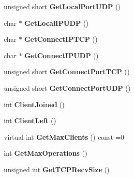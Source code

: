 \begin{DoxyCompactItemize}
\item 
\hypertarget{classcl_instance_a696669cb35e75be553df94b7593476bf}{
unsigned short {\bfseries GetLocalPortUDP} ()}
\label{classcl_instance_a696669cb35e75be553df94b7593476bf}

\item 
\hypertarget{classcl_instance_a43e412a4c0e23932fee3fb3b03f2c371}{
char $\ast$ {\bfseries GetLocalIPUDP} ()}
\label{classcl_instance_a43e412a4c0e23932fee3fb3b03f2c371}

\item 
\hypertarget{classcl_instance_a89e5a85c9993efcdd22b3fdb344acfbb}{
char $\ast$ {\bfseries GetConnectIPTCP} ()}
\label{classcl_instance_a89e5a85c9993efcdd22b3fdb344acfbb}

\item 
\hypertarget{classcl_instance_a80366833606567b205ad741937342138}{
char $\ast$ {\bfseries GetConnectIPUDP} ()}
\label{classcl_instance_a80366833606567b205ad741937342138}

\item 
\hypertarget{classcl_instance_a6c2458e67f576cdc066ad6611fabf6ce}{
unsigned short {\bfseries GetConnectPortTCP} ()}
\label{classcl_instance_a6c2458e67f576cdc066ad6611fabf6ce}

\item 
\hypertarget{classcl_instance_abbb7a8d945bf4d1ae7a15fed95c2b702}{
unsigned short {\bfseries GetConnectPortUDP} ()}
\label{classcl_instance_abbb7a8d945bf4d1ae7a15fed95c2b702}

\item 
\hypertarget{classcl_instance_aec9afd785b997a78f582e228990d9276}{
int {\bfseries ClientJoined} ()}
\label{classcl_instance_aec9afd785b997a78f582e228990d9276}

\item 
\hypertarget{classcl_instance_a92d8ed96f8b0b9af0816700be9e35622}{
int {\bfseries ClientLeft} ()}
\label{classcl_instance_a92d8ed96f8b0b9af0816700be9e35622}

\item 
\hypertarget{classcl_instance_a0119006ea9ac46d424f05c2950881b7f}{
virtual int {\bfseries GetMaxClients} () const =0}
\label{classcl_instance_a0119006ea9ac46d424f05c2950881b7f}

\item 
\hypertarget{classcl_instance_a975ae2c35964b2049280c706871e0edf}{
int {\bfseries GetMaxOperations} ()}
\label{classcl_instance_a975ae2c35964b2049280c706871e0edf}

\item 
\hypertarget{classcl_instance_a4e7856a0fd071aa2484390fa29dc9604}{
unsigned int {\bfseries GetTCPRecvSize} ()}
\label{classcl_instance_a4e7856a0fd071aa2484390fa29dc9604}


\end{DoxyCompactItemize}
